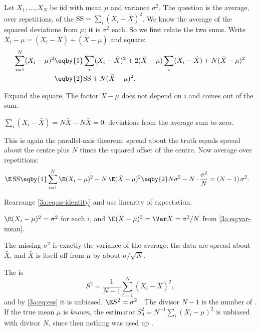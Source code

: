 Let $X_1,\dots,X_N$ be iid with mean $\mu$ and variance $\sigma^2$. The
question is the average, over repetitions, of the  $\mathrm{SS}=\sum_i(X_i-\bar X)^2$. We know the average of the
squared deviations from $\mu$; it is $\sigma^2$ each. So we first relate the
two sums. Write $X_i-\mu=(X_i-\bar X)+(\bar X-\mu)$ and square:
\begin{align}
  \sum_{i=1}^N(X_i-\mu)^2
  &\eqby{1} \sum_i(X_i-\bar X)^2+2(\bar X-\mu)\sum_i(X_i-\bar X)+N(\bar X-\mu)^2
     \nonumber\\
  &\eqby{2} \mathrm{SS}+N(\bar X-\mu)^2 .
  \label{3a:eq:ss-identity}
\end{align}
\begin{explain}
  \item Expand the square. The factor $\bar X-\mu$ does not depend on $i$ and
        comes out of the sum.
  \item $\sum_i(X_i-\bar X)=N\bar X-N\bar X=0$: deviations from the average sum
        to zero.
\end{explain}
This is again the parallel-axis theorem: spread about the truth equals
spread about the centre plus $N$ times the squared offset of the centre.
Now average over repetitions:
\begin{align}
  \E\,\mathrm{SS}
  &\eqby{1} \sum_{i=1}^N\E(X_i-\mu)^2-N\,\E(\bar X-\mu)^2
   \eqby{2} N\sigma^2-N\cdot\frac{\sigma^2}{N}
   = (N-1)\,\sigma^2 .
  \label{3a:eq:ess}
\end{align}
\begin{explain}
  \item Rearrange \eqref{3a:eq:ss-identity} and use linearity of expectation.
  \item $\E(X_i-\mu)^2=\sigma^2$ for each $i$, and $\E(\bar X-\mu)^2=\Var\bar X=\sigma^2/N$ from \eqref{3a:eq:var-mean}.
\end{explain}
The missing $\sigma^2$ is exactly the variance of the average: the data are
spread about $\bar X$, and $\bar X$ is itself off from $\mu$ by about
$\sigma/\sqrt N$.

\begin{workdef}
The  is
\begin{equation}
  S^2=\frac{1}{N-1}\sum_{i=1}^N(X_i-\bar X)^2 ,
  \label{3a:eq:s2}
\end{equation}
and by \eqref{3a:eq:ess} it is unbiased, $\E S^2=\sigma^2$ . The divisor
$N-1$ is the number of  .
If the true mean $\mu$ is \emph{known}, the estimator
$S_0^2=N^{-1}\sum_i(X_i-\mu)^2$ is unbiased with divisor $N$, since then
nothing was used up .
\end{workdef}

